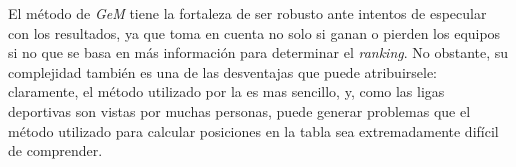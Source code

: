 	El método de \emph{GeM} tiene la fortaleza de ser robusto ante intentos de especular con los resultados, ya que toma en cuenta no solo si ganan o pierden los equipos si no que se basa en más información para determinar el \emph{ranking}. No obstante, su complejidad también es una de las desventajas que puede atribuirsele: claramente, el método utilizado por la  es mas sencillo, y, como las ligas deportivas son vistas por muchas personas, puede generar problemas que el método utilizado para calcular posiciones en la tabla sea extremadamente difícil de comprender. 

